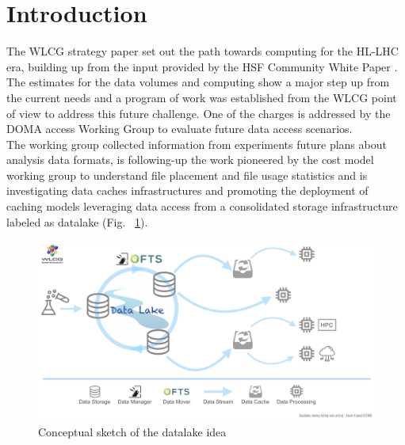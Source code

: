 \section{Introduction}
The WLCG strategy paper \cite{wlcg} set out the path towards computing for the HL-LHC era, building up from the input provided by the HSF \cite{hsf} Community White Paper \cite{cwp}.
The estimates for the data volumes and computing show a major step up from the current needs and a program of work was established from the WLCG point of view to address this future challenge. One of the charges is addressed by the DOMA access Working Group to evaluate future data access scenarios.\\
The working group collected information from experiments future plans about analysis data formats, is following-up the work pioneered by the cost model working group to understand file placement and file usage statistics and is investigating data caches infrastructures and promoting the deployment of caching models leveraging data access from a consolidated storage infrastructure labeled as datalake (Fig. ~\ref{datalake-sketch-horizontal}).

\begin{figure}
  \centering
  \includegraphics[height=6cm]{Datalake-sketch-horizontal.png}
  \caption{{\em} Conceptual sketch of the datalake idea}
  \label{datalake-sketch-horizontal}
\end{figure}



